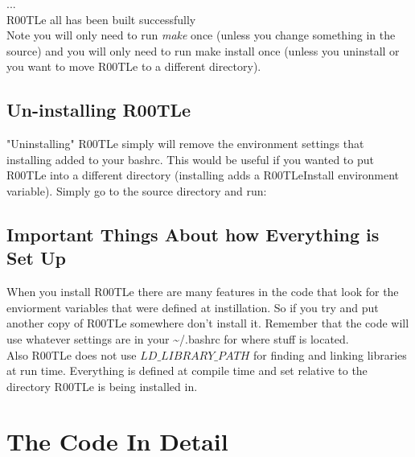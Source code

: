 \documentclass[paper=a4, fontsize=12pt]{scrartcl} %
\numberwithin{equation}{section} %
\numberwithin{figure}{section} %
\numberwithin{table}{section} %
\newcommand{\example}[1]{\begin{center} \fbox{#1} \end{center}}
\begin{document}
... \\

R00TLe all has been built successfully\\


Note you will only need to run \textit{make} once (unless you change something in the source) and you will only need to run make install once (unless you uninstall or you want to move R00TLe to a different directory).

\subsection{Un-installing R00TLe}
"Uninstalling" R00TLe simply will remove the environment settings that installing added to your bashrc.  This would be useful if you wanted to put R00TLe into a different directory (installing adds a R00TLeInstall environment variable).  Simply go to the source directory and run:
\example {make uninstall}


\subsection{Important Things About how Everything is Set Up}

When you install R00TLe there are many features in the code that look for the enviorment variables that were defined at instillation.  So if you try and put another copy of R00TLe somewhere don't install it.  Remember that the code will use whatever settings are in your \textasciitilde/.bashrc for where stuff is located. \\

Also R00TLe does not use $LD\_LIBRARY\_PATH$ for finding and linking libraries at run time.  Everything is defined at compile time and set relative to the directory R00TLe is being installed in.

\section{The Code In Detail}
\end{document}
